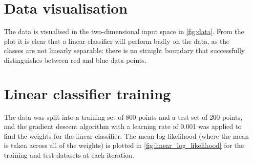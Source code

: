 \documentclass[a4paper]{article}
\begin{document}
    \section{Data visualisation}\label{sec:data-visualisation}
    The data is visualised in the two-dimensional input space in \autoref{fig:data}. From the plot it is clear that a
    linear classifier will perform badly on the data, as the classes are not linearly separable: there is no straight
    boundary that successfully distinguishes between red and blue data points.

    \section{Linear classifier training}\label{sec:linear-training}
    The data was split into a training set of 800 points and a test set of 200 points, and the gradient descent
    algorithm with a learning rate of 0.001 was applied to find the weights for the linear classifier. The mean
    log-likelihood (where the mean is taken across all of the weights) is plotted in \autoref{fig:linear_log_likelihood} for
    the training and test datasets at each iteration.
\end{document}

